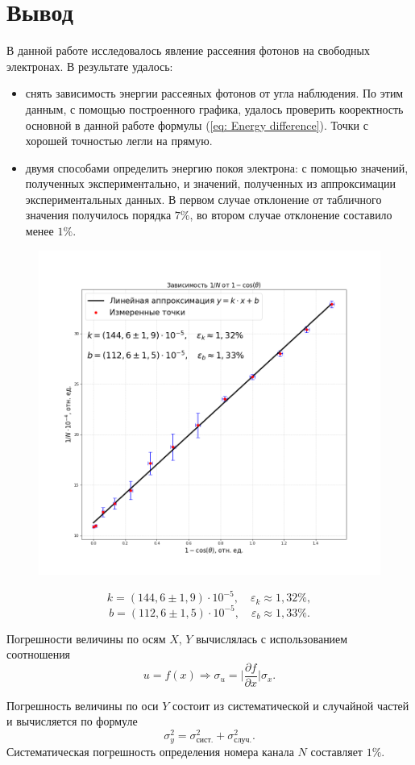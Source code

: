 \documentclass[a4paper,12pt]{article}
\begin{document}
\section{Вывод}
В данной работе исследовалось явление рассеяния фотонов на свободных электронах. В результате удалось:
\begin{itemize}
    \item
    снять зависимость энергии рассеяных фотонов от угла наблюдения. По этим данным, с помощью построенного графика, удалось проверить кооректность основной в данной работе формулы (\ref{eq: Energy difference}). Точки с хорошей точностью легли на прямую.
    
    \item
    двумя способами определить энергию покоя электрона: с помощью значений, полученных экспериментально, и значений, полученных из аппроксимации экспериментальных данных. В первом случае отклонение от табличного значения получилось порядка $7\%$, во втором случае отклонение составило менее $1\%$.
    
\end{itemize}

\newpage

\begin{figure}[H]\label{fig: 1divN(1 - cosTheta)}
    \centering
    \includegraphics[width = \textwidth]{1divN(1 - cosTheta).png}
\end{figure}
\[k = (144,6 \pm 1,9)\cdot 10^{-5}, \quad \varepsilon_k \approx 1,32\%, \]
\[b = (112,6 \pm 1,5)\cdot 10^{-5}, \quad \varepsilon_b \approx 1,33\%. \]

Погрешности величины по осям $X$, $Y$ вычислялась с использованием соотношения 
\[u = f(x) \Rightarrow \sigma_u = \bigg|\frac{\partial f}{\partial x}\bigg| \sigma_x. \]

Погрешность величины по оси $Y$ состоит из систематической и случайной частей и вычисляется по формуле
\[\sigma_y^2 = \sigma_{\text{сист.}}^2 + \sigma_{\text{случ.}}^2. \]
Систематическая погрешность определения номера канала $N$ составляет $1\%$.

\end{document}
